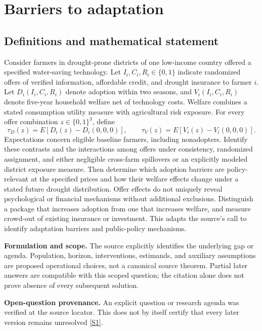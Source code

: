 \documentclass[11pt]{article}
\newcommand{\sref}[2]{\hyperlink{source:#1:#2}{[S#2]}}
\begin{document}
\section*{Barriers to adaptation}\label{30007716}
\subsection{Definitions and mathematical statement}
Consider farmers in drought-prone districts of one low-income country offered a specified water-saving technology. Let \(I_i,C_i,R_i\in\{0,1\}\) indicate randomized offers of verified information, affordable credit, and drought insurance to farmer \(i\). Let \(D_i(I_i,C_i,R_i)\) denote adoption within two seasons, and \(V_i(I_i,C_i,R_i)\) denote five-year household welfare net of technology costs. Welfare combines a stated consumption utility measure with agricultural risk exposure. For every offer combination \(z\in\{0,1\}^3\), define
\[\tau_D(z)=E[D_i(z)-D_i(0,0,0)],\qquad\tau_V(z)=E[V_i(z)-V_i(0,0,0)].\]
Expectations concern eligible baseline farmers, including nonadopters. Identify these contrasts and the interactions among offers under consistency, randomized assignment, and either negligible cross-farm spillovers or an explicitly modeled district exposure measure. Then determine which adoption barriers are policy-relevant at the specified prices and how their welfare effects change under a stated future drought distribution. Offer effects do not uniquely reveal psychological or financial mechanisms without additional exclusions. Distinguish a package that increases adoption from one that increases welfare, and measure crowd-out of existing insurance or investment. This adapts the source’s call to identify adaptation barriers and public-policy mechanisms.

\par\textbf{Formulation and scope.} The source explicitly identifies the underlying gap or agenda. Population, horizon, interventions, estimands, and auxiliary assumptions are proposed operational choices, not a canonical source theorem. Partial later answers are compatible with this scoped question; the citation alone does not prove absence of every subsequent solution.

\par\textbf{Open-question provenance.} An explicit question or research agenda was verified at the source locator. This does not by itself certify that every later version remains unresolved \sref{30007716}{1}.
\end{document}
